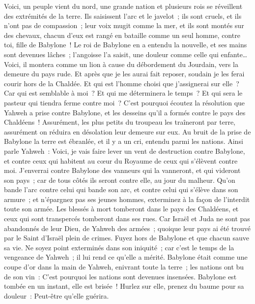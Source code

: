 \begin{multicols}{2}
Voici, un peuple vient du nord, une grande nation et plusieurs rois se réveillent des extrémités de la terre.
Ils saisissent l'arc et le javelot~; ils sont cruels, et ils n'ont pas de compassion~; leur voix mugit comme la mer, et ils sont montés sur des chevaux, chacun d'eux est rangé en bataille comme un seul homme, contre toi, fille de Babylone~!
Le roi de Babylone en a entendu la nouvelle, et ses mains sont devenues lâches~; l'angoisse l'a saisit, une douleur comme celle qui enfante…
Voici, il montera comme un lion à cause du débordement du Jourdain, vers la demeure du pays rude. Et après que je les aurai fait reposer, soudain je les ferai courir hors de la Chaldée. Et qui est l'homme choisi que j'assignerai sur elle~? Car qui est semblable à moi~? Et qui me déterminera le temps~? Et qui sera le pasteur qui tiendra ferme contre moi~?
C'est pourquoi écoutez la résolution que Yahweh a prise contre Babylone, et les desseins qu'il a formés contre le pays des Chaldéens~! Assurément, les plus petits du troupeau les traîneront par terre, assurément on réduira en désolation leur demeure sur eux.
Au bruit de la prise de Babylone la terre est ébranlée, et il y a un cri, entendu parmi les nations.
\VerseOne{}Ainsi parle Yahweh~: Voici, je vais faire lever un vent de destruction contre Babylone, et contre ceux qui habitent au cœur du Royaume de ceux qui s'élèvent contre moi.
J'enverrai contre Babylone des vanneurs qui la vanneront, et qui videront son pays~; car de tous côtés ils seront contre elle, au jour du malheur.
Qu'on bande l'arc contre celui qui bande son arc, et contre celui qui s'élève dans son armure~; et n'épargnez pas ses jeunes hommes, exterminez à la façon de l'interdit toute son armée.
Les blessés à mort tomberont dans le pays des Chaldéens, et ceux qui sont transpercés tomberont dans ses rues.
Car Israël et Juda ne sont pas abandonnés de leur Dieu, de Yahweh des armées~; quoique leur pays ai été trouvé par le Saint d'Israël plein de crimes.
Fuyez hors de Babylone et que chacun sauve sa vie. Ne soyez point exterminés dans son iniquité~; car c'est le temps de la vengeance de Yahweh~; il lui rend ce qu'elle a mérité.
Babylone était comme une coupe d'or dans la main de Yahweh, enivrant toute la terre~; les nations ont bu de son vin~: C'est pourquoi les nations sont devenues insensées.
Babylone est tombée en un instant, elle est brisée~! Hurlez sur elle, prenez du baume pour sa douleur~: Peut-être qu'elle guérira.

\end{multicols}

